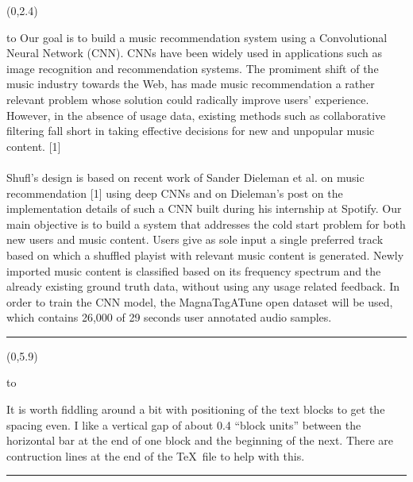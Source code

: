 \documentclass[a0]{a0poster}
\def\Head#1{
  \noindent\hbox to \hsize{\hfil{\LARGE\color{DarkBlue}\sf #1}}\bigskip}
\begin{document}
  \begin{textblock}{7}(0,2.4)
    \Head{Introduction}
    \sf %
    Our goal is to build a music recommendation system using a Convolutional
    Neural Network (CNN). CNNs have been widely used in applications such as
    image recognition and recommendation systems. The promiment shift of the
    music industry towards the Web, has made music recommendation a rather
    relevant problem whose solution could radically improve users' experience.
    However, in the absence of usage data, existing methods such as
    collaborative filtering fall short in taking effective decisions for new
    and unpopular music content. [1]
    \\ \\
    Shufl's design is based on recent work of Sander Dieleman et al. on music
    recommendation [1] using deep CNNs and on Dieleman's post on the
    implementation details of such a CNN built during his internship at
    Spotify. Our main objective is to build a system that addresses the cold
    start problem for both new users and music content. Users give as sole
    input a single preferred track based on which a shuffled playist with
    relevant music content is generated. Newly imported music content is
    classified based on its frequency spectrum and the already existing ground
    truth data, without using any usage related feedback. In order to train
    the CNN model, the MagnaTagATune open dataset will be used, which contains
    26,000 of 29 seconds user annotated audio samples.

    \bigskip
    \hrule
  \end{textblock}

  \begin{textblock}{7}(0,5.9)
    \Head{The Problem}

    \sf 
    It is worth fiddling around a bit with positioning of the text blocks to
    get the spacing even. I like a vertical gap of about 0.4 ``block units''
    between the horizontal bar at the end of one block and the beginning of the
    next. There are contruction lines at the end of the \TeX\ file to help with
    this.

    \bigskip
    \hrule
  \end{textblock}
\end{document}
